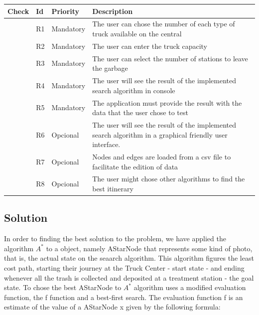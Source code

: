 \documentclass[a4paper]{article}
\begin{document}
\begin{table}[H]
	\centering
	\label{tab:list-of-requirements}
	\begin{tabular}{ | m{2cm} | m{0.5cm} | m{2cm} | m{9cm} | }
		\hline
	\textbf{Check} &	\textbf{Id} & \textbf{Priority} & \textbf{Description} \\[2ex] \hline
		\centering \checkmark & R1 & Mandatory        & The user can chose the number of each type of truck available on the central \\ \hline
		\centering \checkmark & R2 & Mandatory         & The user can enter the truck capacity \\ \hline
		\centering \checkmark & R3 & Mandatory          & The user can select the number of stations to leave the garbage \\ \hline
		\centering \checkmark & R4 & Mandatory         & The user will see the result of the implemented search algorithm in console \\ \hline
		\centering \checkmark & R5 & Mandatory         & The application must provide the result with the data that the user chose to test \\ \hline
		\centering \checkmark & R6 & Opcional         & The user will see the result of the implemented search algorithm in a graphical friendly user interface. \\ \hline
		\centering \checkmark & R7 & Opcional         & Nodes and edges are loaded from a csv file to facilitate the edition of data \\ \hline
		\centering \checkmark & R8 & Opcional         & The user might chose other algorithms to find the best itinerary \\ \hline
	\end{tabular}
\end{table}

\subsection{Solution}\label{solution}

In order to finding the best solution to the problem, we have applied the algorithm $A^*$ to a object, namely AStarNode that represents some kind of photo, that is, the actual state on the seaarch algorithm. This algorithm figures the least cost path, starting their journey at the Truck Center - start state - and ending whenever all the trash is collected and deposited at a treatment station - the goal state. To chose the best AStarNode to $A^*$ algorithm uses a modified
evaluation function, the f function and a best-first search. The evaluation function f is an estimate of the value of a AStarNode x given by the following formula:
\end{document}
